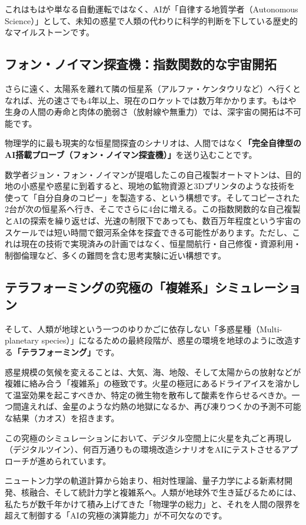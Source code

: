 これはもはや単なる自動運転ではなく、AIが「自律する地質学者（Autonomous Science）」として、未知の惑星で人類の代わりに科学的判断を下している歴史的なマイルストーンです。

\subsection{フォン・ノイマン探査機：指数関数的な宇宙開拓}

さらに遠く、太陽系を離れて隣の恒星系（アルファ・ケンタウリなど）へ行くとなれば、光の速さでも4年以上、現在のロケットでは数万年かかります。もはや生身の人間の寿命と肉体の脆弱さ（放射線や無重力）では、深宇宙の開拓は不可能です。

物理学的に最も現実的な恒星間探査のシナリオは、人間ではなく\textbf{「完全自律型のAI搭載プローブ（フォン・ノイマン探査機）」}を送り込むことです。

数学者ジョン・フォン・ノイマンが提唱したこの自己複製オートマトンは、目的地の小惑星や惑星に到着すると、現地の鉱物資源と3Dプリンタのような技術を使って「自分自身のコピー」を製造する、という構想です。そしてコピーされた2台が次の恒星系へ行き、そこでさらに4台に増える。この指数関数的な自己複製とAIの探索を繰り返せば、光速の制限下であっても、数百万年程度という宇宙のスケールでは短い時間で銀河系全体を探査できる可能性があります。ただし、これは現在の技術で実現済みの計画ではなく、恒星間航行・自己修復・資源利用・制御倫理など、多くの難問を含む思考実験に近い構想です。

\subsection{テラフォーミングの究極の「複雑系」シミュレーション}

そして、人類が地球という一つのゆりかごに依存しない「多惑星種（Multi-planetary species）」になるための最終段階が、惑星の環境を地球のように改造する\textbf{「テラフォーミング」}です。

惑星規模の気候を変えることは、大気、海、地殻、そして太陽からの放射などが複雑に絡み合う「複雑系」の極致です。火星の極冠にあるドライアイスを溶かして温室効果を起こすべきか、特定の微生物を散布して酸素を作らせるべきか。一つ間違えれば、金星のような灼熱の地獄になるか、再び凍りつくかの予測不可能な結果（カオス）を招きます。

この究極のシミュレーションにおいて、デジタル空間上に火星を丸ごと再現し（デジタルツイン）、何百万通りもの環境改造シナリオをAIにテストさせるアプローチが進められています。

ニュートン力学の軌道計算から始まり、相対性理論、量子力学による新素材開発、核融合、そして統計力学と複雑系へ。人類が地球外で生き延びるためには、私たちが数千年かけて積み上げてきた「物理学の総力」と、それを人間の限界を超えて制御する「AIの究極の演算能力」が不可欠なのです。

